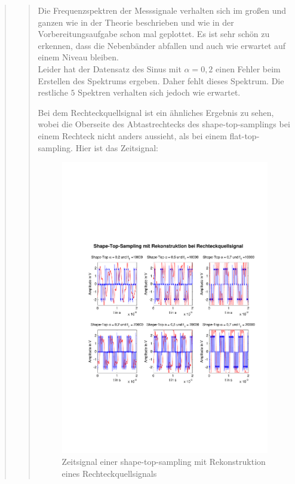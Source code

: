 \begin{quote}
\begin{quote}
            Die Frequenzspektren der Messsignale verhalten sich im großen und ganzen wie in der Theorie beschrieben und
            wie in der Vorbereitungsaufgabe schon mal geplottet. Es ist sehr schön zu erkennen, dass die Nebenbänder
            abfallen und auch wie erwartet auf einem Niveau bleiben.\\
            Leider hat der Datensatz des Sinus mit $\alpha = 0,2$ einen Fehler beim Erstellen des Spektrums ergeben.
            Daher fehlt dieses Spektrum. Die restliche $5$ Spektren verhalten sich jedoch wie erwartet.\vspace{1em}
            
            
                    
        	Bei dem Rechteckquellsignal ist ein ähnliches Ergebnis zu sehen, wobei die
        	Oberseite des Abtastrechtecks des shape-top-samplings bei einem Rechteck
        	nicht anders aussieht, als bei einem flat-top-sampling. Hier ist das
        	Zeitsignal:
        	   	
        	\begin{figure}[H]
            \centering
            \includegraphics[scale=0.6, trim = 1.5cm 6cm 1cm 8cm,
            clip]{./Bilder/shape-top-recht}
                \caption{Zeitsignal einer shape-top-sampling mit Rekonstruktion
                eines Rechteckquellsignals}
      	    \end{figure}
      	    

\end{quote}
\end{quote}
